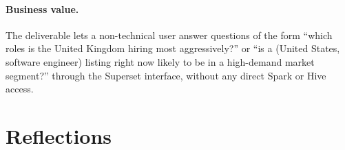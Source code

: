 \documentclass[11pt,a4paper]{article}
\begin{document}
\paragraph{Business value.}
The deliverable lets a non-technical user answer questions of the
form ``which roles is the United Kingdom hiring most aggressively?''
or ``is a (United States, software engineer) listing right now likely
to be in a high-demand market segment?'' through the Superset
interface, without any direct Spark or Hive access.

\section{Reflections}
\label{sec:reflections}
\end{document}
